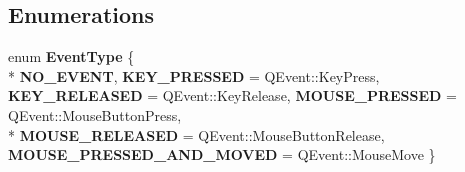 \subsection*{Enumerations}
\begin{DoxyCompactItemize}
\item 
enum {\bfseries Event\-Type} \{ \\*
{\bfseries N\-O\-\_\-\-E\-V\-E\-N\-T}, 
{\bfseries K\-E\-Y\-\_\-\-P\-R\-E\-S\-S\-E\-D} = Q\-Event\-:\-:Key\-Press, 
{\bfseries K\-E\-Y\-\_\-\-R\-E\-L\-E\-A\-S\-E\-D} = Q\-Event\-:\-:Key\-Release, 
{\bfseries M\-O\-U\-S\-E\-\_\-\-P\-R\-E\-S\-S\-E\-D} = Q\-Event\-:\-:Mouse\-Button\-Press, 
\\*
{\bfseries M\-O\-U\-S\-E\-\_\-\-R\-E\-L\-E\-A\-S\-E\-D} = Q\-Event\-:\-:Mouse\-Button\-Release, 
{\bfseries M\-O\-U\-S\-E\-\_\-\-P\-R\-E\-S\-S\-E\-D\-\_\-\-A\-N\-D\-\_\-\-M\-O\-V\-E\-D} = Q\-Event\-:\-:Mouse\-Move
 \}
\end{DoxyCompactItemize}

